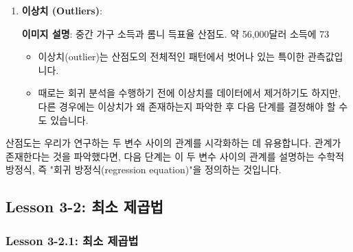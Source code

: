 \documentclass[11pt,a4paper]{book}
\theoremstyle{definition}
\begin{document}
\begin{tcolorbox}[infobox, title={산점도 분석 (Looking at Scatter Plots)}]
\begin{enumerate}[label=\arabic*.]
    \item \textbf{이상치 (Outliers)}:
    \begin{center}
    \end{center}
    \textbf{이미지 설명}: 중간 가구 소득과 롬니 득표율 산점도. 약 56,000달러 소득에 73%
    \begin{itemize}
        \item 이상치(outlier)는 산점도의 전체적인 패턴에서 벗어나 있는 특이한 관측값입니다.
        \item 때로는 회귀 분석을 수행하기 전에 이상치를 데이터에서 제거하기도 하지만, 다른 경우에는 이상치가 왜 존재하는지 파악한 후 다음 단계를 결정해야 할 수도 있습니다.
    \end{itemize}
\end{enumerate}
산점도는 우리가 연구하는 두 변수 사이의 관계를 시각화하는 데 유용합니다. 관계가 존재한다는 것을 파악했다면, 다음 단계는 이 두 변수 사이의 관계를 설명하는 수학적 방정식, 즉 "회귀 방정식(regression equation)"을 정의하는 것입니다.
\end{tcolorbox}


\subsection{Lesson 3-2: 최소 제곱법}

\subsubsection{Lesson 3-2.1: 최소 제곱법}
\end{document}

